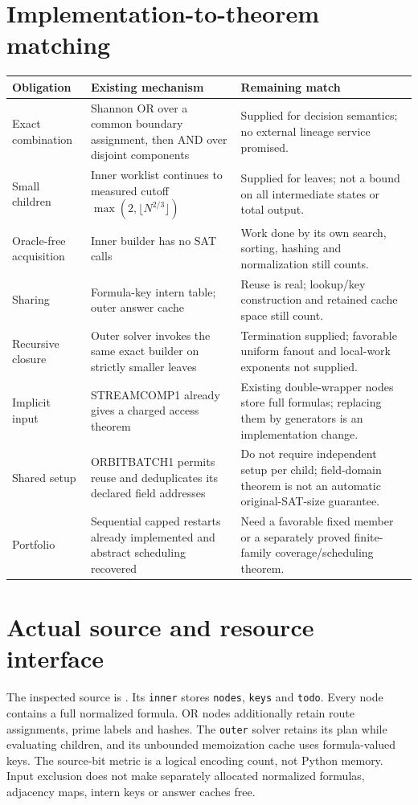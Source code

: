 \documentclass[11pt]{article}
\begin{document}
\section*{Implementation-to-theorem matching}
\begin{center}\small
\begin{tabularx}{\textwidth}{p{}XX}
\toprule
Obligation & Existing mechanism & Remaining match\\
\midrule
Exact combination & Shannon OR over a common boundary assignment, then AND over disjoint components & Supplied for decision semantics; no external lineage service promised.\\
Small children & Inner worklist continues to measured cutoff $\max(2,\lfloor N^{2/3}\rfloor)$ & Supplied for leaves; not a bound on all intermediate states or total output.\\
Oracle-free acquisition & Inner builder has no SAT calls & Work done by its own search, sorting, hashing and normalization still counts.\\
Sharing & Formula-key intern table; outer answer cache & Reuse is real; lookup/key construction and retained cache space still count.\\
Recursive closure & Outer solver invokes the same exact builder on strictly smaller leaves & Termination supplied; favorable uniform fanout and local-work exponents not supplied.\\
Implicit input & STREAMCOMP1 already gives a charged access theorem & Existing double-wrapper nodes store full formulas; replacing them by generators is an implementation change.\\
Shared setup & ORBITBATCH1 permits reuse and deduplicates its declared field addresses & Do not require independent setup per child; field-domain theorem is not an automatic original-SAT-size guarantee.\\
Portfolio & Sequential capped restarts already implemented and abstract scheduling recovered & Need a favorable fixed member or a separately proved finite-family coverage/scheduling theorem.\\
\bottomrule
\end{tabularx}\end{center}

\section*{Actual source and resource interface}
The inspected source is
.
Its \texttt{inner} stores \texttt{nodes}, \texttt{keys} and \texttt{todo}.
Every node contains a full normalized formula. OR nodes additionally retain
route assignments, prime labels and hashes. The \texttt{outer} solver retains
its plan while evaluating children, and its unbounded memoization cache uses
formula-valued keys. The source-bit metric is a logical encoding count, not
Python memory. Input exclusion does not make separately allocated normalized
formulas, adjacency maps, intern keys or answer caches free.
\end{document}
